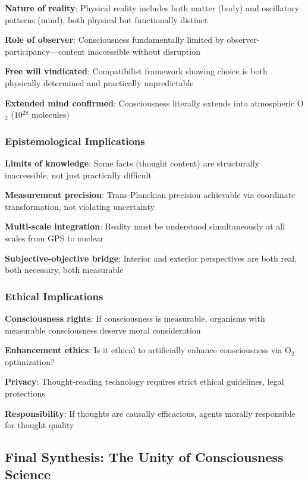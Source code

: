 \documentclass[11pt,onecolumn]{article}
\begin{document}
\textbf{Nature of reality}: Physical reality includes both matter (body) and oscillatory patterns (mind), both physical but functionally distinct

\textbf{Role of observer}: Consciousness fundamentally limited by observer-participancy---content inaccessible without disruption

\textbf{Free will vindicated}: Compatibilist framework showing choice is both physically determined and practically unpredictable

\textbf{Extended mind confirmed}: Consciousness literally extends into atmospheric O$_2$ (10$^{28}$ molecules)

\subsubsection{Epistemological Implications}

\textbf{Limits of knowledge}: Some facts (thought content) are structurally inaccessible, not just practically difficult

\textbf{Measurement precision}: Trans-Planckian precision achievable via coordinate transformation, not violating uncertainty

\textbf{Multi-scale integration}: Reality must be understood simultaneously at all scales from GPS to nuclear

\textbf{Subjective-objective bridge}: Interior and exterior perspectives are both real, both necessary, both measurable

\subsubsection{Ethical Implications}

\textbf{Consciousness rights}: If consciousness is measurable, organisms with measurable consciousness deserve moral consideration

\textbf{Enhancement ethics}: Is it ethical to artificially enhance consciousness via O$_2$ optimization?

\textbf{Privacy}: Thought-reading technology requires strict ethical guidelines, legal protections

\textbf{Responsibility}: If thoughts are causally efficacious, agents morally responsible for thought quality

\subsection{Final Synthesis: The Unity of Consciousness Science}
\end{document}
